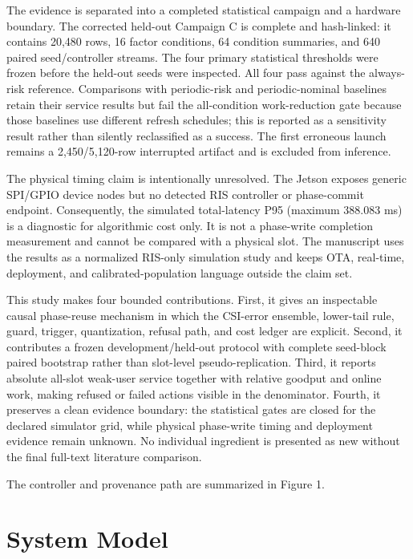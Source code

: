 \documentclass[10pt,twocolumn]{article}
\begin{document}
The evidence is separated into a completed statistical campaign and a
hardware boundary. The corrected held-out Campaign C is complete and
hash-linked: it contains 20,480 rows, 16 factor conditions, 64 condition
summaries, and 640 paired seed/controller streams. The four primary
statistical thresholds were frozen before the held-out seeds were
inspected. All four pass against the always-risk reference. Comparisons
with periodic-risk and periodic-nominal baselines retain their service
results but fail the all-condition work-reduction gate because those
baselines use different refresh schedules; this is reported as a
sensitivity result rather than silently reclassified as a success. The
first erroneous launch remains a 2,450/5,120-row interrupted artifact
and is excluded from inference.

The physical timing claim is intentionally unresolved. The Jetson
exposes generic SPI/GPIO device nodes but no detected RIS controller or
phase-commit endpoint. Consequently, the simulated total-latency P95
(maximum 388.083 ms) is a diagnostic for algorithmic cost only. It is
not a phase-write completion measurement and cannot be compared with a
physical slot. The manuscript uses the results as a normalized RIS-only
simulation study and keeps OTA, real-time, deployment, and
calibrated-population language outside the claim set.

This study makes four bounded contributions. First, it gives an
inspectable causal phase-reuse mechanism in which the CSI-error
ensemble, lower-tail rule, guard, trigger, quantization, refusal path,
and cost ledger are explicit. Second, it contributes a frozen
development/held-out protocol with complete seed-block paired bootstrap
rather than slot-level pseudo-replication. Third, it reports absolute
all-slot weak-user service together with relative goodput and online
work, making refused or failed actions visible in the denominator.
Fourth, it preserves a clean evidence boundary: the statistical gates
are closed for the declared simulator grid, while physical phase-write
timing and deployment evidence remain unknown. No individual ingredient
is presented as new without the final full-text literature comparison.

The controller and provenance path are summarized in Figure 1.

\section{System Model}\label{system-model}
\end{document}

